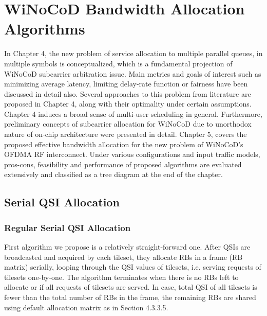 
\chapter{WiNoCoD Bandwidth Allocation Algorithms} %

\label{Chapter5} %



In Chapter 4, the new problem of service allocation to multiple parallel queues, in multiple symbols is conceptualized, which is a fundamental projection of WiNoCoD subcarrier arbitration issue. Main metrics and goals of interest such as minimizing average latency, limiting delay-rate function or fairness have been discussed in detail also. Several approaches to this problem from literature are proposed in Chapter 4, along with their optimality under certain assumptions. Chapter 4 induces a broad sense of multi-user scheduling in general. Furthermore, preliminary concepts of subcarrier allocation for WiNoCoD due to unorthodox nature of on-chip architecture were presented in detail. Chapter 5, covers the proposed effective bandwidth allocation for the new problem of WiNoCoD's OFDMA RF interconnect. Under various configurations and input traffic models, pros-cons, feasibility and performance of proposed algorithms are evaluated extensively and classified as a tree diagram at the end of the chapter.     


\section{Serial QSI Allocation}

\subsection{Regular Serial QSI Allocation}

First algorithm we propose is a relatively straight-forward one. After QSIs are broadcasted and acquired by each tileset, they allocate RBs in a frame (RB matrix) serially, looping through the QSI values of tilesets, i.e. serving requests of tilesets one-by-one. The algorithm terminates when there is no RBs left to allocate or if all requests of tilesets are served. In case, total QSI of all tilesets is fewer than the total number of RBs in the frame, the remaining RBs are shared using default allocation matrix as in Section 4.3.3.5. 

